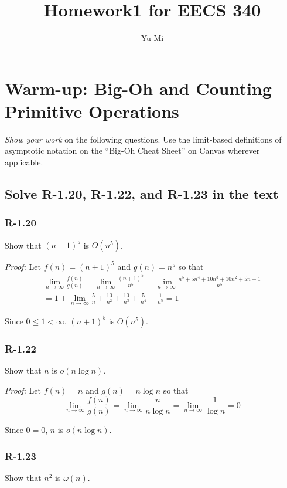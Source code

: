 \documentclass[11pt]{article}
\begin{document}
	\title{Homework1 for EECS 340}
	\author{Yu Mi}
	\maketitle
\section{Warm-up: Big-Oh and Counting Primitive Operations}
\emph{Show your work} on the following questions. Use the limit-based definitions of asymptotic notation on the ``Big-Oh Cheat Sheet'' on Canvas wherever applicable.
\subsection{Solve R-1.20, R-1.22, and R-1.23 in the text}
\subsubsection{R-1.20}
	Show that $(n+1)^5$ is $O(n^5)$.

	\emph{Proof:} Let $f(n)=(n+1)^5$ and $g(n)=n^5$ so that
	\begin{equation*}
	\begin{multlined}
		\lim_{n\to\infty} \frac{f(n)}{g(n)}=\lim_{n\to\infty} \frac{(n+1)^5}{n^5}=\lim_{n\to\infty} \frac{n^5+5n^4+10n^3+10n^2+5n+1}{n^5}\\
		=1+\lim_{n\to\infty}\frac{5}{n}+\frac{10}{n^2}+\frac{10}{n^3}+\frac{5}{n^4}+\frac{1}{n^5}=1
	\end{multlined}
	\end{equation*}

	Since $0\leq1<\infty$, $(n+1)^5$ is $O(n^5)$.
\subsubsection{R-1.22}
	Show that $n$ is $o(n\log n)$.
	
	\emph{Proof:} Let $f(n)=n$ and $g(n)=n\log n$ so that
	\begin{equation*}
		\lim_{n\to\infty} \frac{f(n)}{g(n)}=\lim_{n\to\infty} \frac{n}{n\log n}=\lim_{n\to\infty} \frac{1}{\log n}=0
	\end{equation*}
	
	Since $0=0$, $n$ is $o(n\log n)$.
\subsubsection{R-1.23}
	Show that $n^2$ is $\omega(n)$.
	
\end{document}

